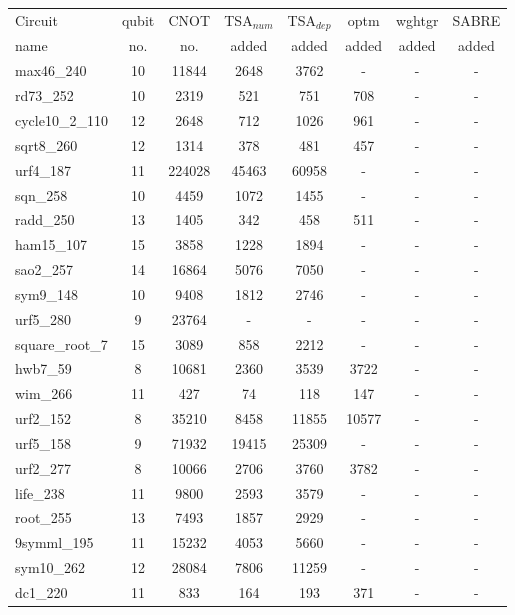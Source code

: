\documentclass[journal]{IEEEtran}
\begin{document}
	\begin{table*}[htbp]
		\begin{center}  
			\begin{tabular}{|p{4.3cm}<{\centering}|c|c|c|c|c|c|c|}
				\hline
				Circuit &  qubit  & CNOT &TSA$_{num}$& TSA$_{dep}$  & optm 	 & wghtgr  &SABRE 	\\
				name	&   no. 	&	no. & added&  added &  added 	&  added&  added\\
				\hline
				max46\_240 & 10 & 11844 & 2648 & 3762 & - & - & - \\ 
				rd73\_252 & 10 & 2319 & 521 & 751 & 708 & - & - \\ 
				cycle10\_2\_110 & 12 & 2648 & 712 & 1026 & 961 & - & - \\ 
				sqrt8\_260 & 12 & 1314 & 378 & 481 & 457 & - & - \\ 
				urf4\_187 & 11 & 224028 & 45463 & 60958 & - & - & - \\ 
				sqn\_258 & 10 & 4459 & 1072 & 1455 & - & - & - \\ 
				radd\_250 & 13 & 1405 & 342 & 458 & 511 & - & - \\ 
				ham15\_107 & 15 & 3858 & 1228 & 1894 & - & - & - \\ 
				sao2\_257 & 14 & 16864 & 5076 & 7050 & - & - & - \\ 
				sym9\_148 & 10 & 9408 & 1812 & 2746 & - & - & - \\ 
				urf5\_280 & 9 & 23764 & - & - & - & - & - \\ 
				square\_root\_7 & 15 & 3089 & 858 & 2212 & - & - & - \\ 
				hwb7\_59 & 8 & 10681 & 2360 & 3539 & 3722 & - & - \\ 
				wim\_266 & 11 & 427 & 74 & 118 & 147 & - & - \\ 
				urf2\_152 & 8 & 35210 & 8458 & 11855 & 10577 & - & - \\ 
				urf5\_158 & 9 & 71932 & 19415 & 25309 & - & - & - \\ 
				urf2\_277 & 8 & 10066 & 2706 & 3760 & 3782 & - & - \\ 
				life\_238 & 11 & 9800 & 2593 & 3579 & - & - & - \\ 
				root\_255 & 13 & 7493 & 1857 & 2929 & - & - & - \\ 
				9symml\_195 & 11 & 15232 & 4053 & 5660 & - & - & - \\ 
				sym10\_262 & 12 & 28084 & 7806 & 11259 & - & - & - \\ 
				dc1\_220 & 11 & 833 & 164 & 193 & 371 & - & - \\ 

\end{tabular}
\end{center}
\end{table*}
\end{document}
